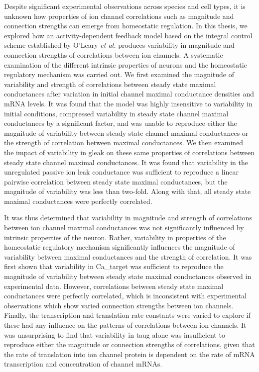 Despite significant experimental observations across species and cell types, it is unknown how properties of ion channel correlations such as magnitude and connection strengths can emerge from homeostatic regulation.
In this thesis, we explored how an activity-dependent feedback model based on the integral control scheme established by O'Leary \textit{et al.} produces variability in magnitude and connection strengths of correlations between ion channels\cite{oleary_correlations_2013}.
A systematic examination of the different intrinsic properties of neurons and the homeostatic regulatory mechanism was carried out.
We first examined the magnitude of variability and strength of correlations between steady state maximal conductances after variation in initial channel maximal conductance densities and mRNA levels. It was found that the model was highly insensitive to variability in initial conditions, compressed variability in steady state channel maximal conductances by a significant factor, and was unable to reproduce either the magnitude of variability between steady state channel maximal conductances or the strength of correlation between maximal conductances.
We then examined the impact of variability in \ac{gleak} on these same properties of correlations between steady state channel maximal conductances. It was found that variability in the unregulated passive ion leak conductance was sufficient to reproduce a linear pairwise correlation between steady state maximal conductances, but the magnitude of variability was less than two-fold\cite{golowasch_activity-dependent_1999}. Along with that, all steady state maximal conductances were perfectly correlated.

It was thus determined that variability in magnitude and strength of correlations between ion channel maximal conductances was not significantly influenced by intrinsic properties of the neuron. Rather, variability in properties of the homeostatic regulatory mechanism significantly influences the magnitude of variability between maximal conductances and the strength of correlation.
It was first shown that variability in \ac{Ca_target} was sufficient to reproduce the magnitude of variability between steady state maximal conductances observed in experimental data. However, correlations between steady state maximal conductances were perfectly correlated, which is inconsistent with experimental observations which show varied connection strengths between ion channels\cite{santin_membrane_2019}.
Finally, the transcription and translation rate constants were varied to explore if these had any influence on the patterns of correlations between ion channels. It was unsurprising to find that variability in \ac{taug} alone was insufficient to reproduce either the magnitude or connection strengths of correlations, given that the rate of translation into ion channel protein is dependent on the rate of mRNA transcription and concentration of channel mRNAs.

